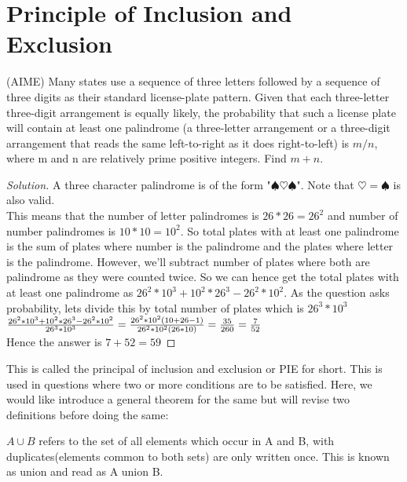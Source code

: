 \section{Principle of Inclusion and Exclusion}
\begin{example}
    (AIME) Many states use a sequence of three letters followed by a sequence of three digits as their standard license-plate pattern. Given that each three-letter three-digit arrangement is equally likely, the probability that such a license plate will contain at least one palindrome (a three-letter arrangement or a three-digit arrangement that reads the same left-to-right as it does right-to-left) is $m/n$, where m and n are relatively prime positive integers. Find $m + n$.
\end{example}
\begin{proof}
    [Solution]
    A three character palindrome is of the form "$\spadesuit \heartsuit \spadesuit$". Note that $\heartsuit = \spadesuit$ is also valid.\\
    This means that the number of letter palindromes is $26*26=26^2$ and number of number palindromes is $10*10=10^2$. So total plates with at least one palindrome is the sum of plates where number is the palindrome and the plates where letter is the palindrome. However, we'll subtract number of plates where both are palindrome as they were counted twice. So we can hence get the total plates with at least one palindrome as $26^2*10^3+10^2*26^3-26^2*10^2$. As the question asks probability, lets divide this by total number of plates which is $26^3*10^3$\\ 
    $\frac{26^2*10^3+10^2*26^3-26^2*10^2}{26^3*10^3} \\
    = \frac{26^2*10^2(10+26-1)}{26^2*10^2(26*10)} \\
    =\frac{35}{260}=\frac{7}{52}$\\
    Hence the answer is $7+52=59$
\end{proof}
This is called the principal of inclusion and exclusion or PIE for short. This is used in questions where two or more conditions are to be satisfied. Here, we would like introduce a general theorem for the same but will revise two definitions before doing the same:\\
\begin{definition}
$A \cup B$ refers to the set of all elements which occur in A and B, with duplicates(elements common to both sets) are only written once. This is known as union and read as A union B.    
\end{definition}
